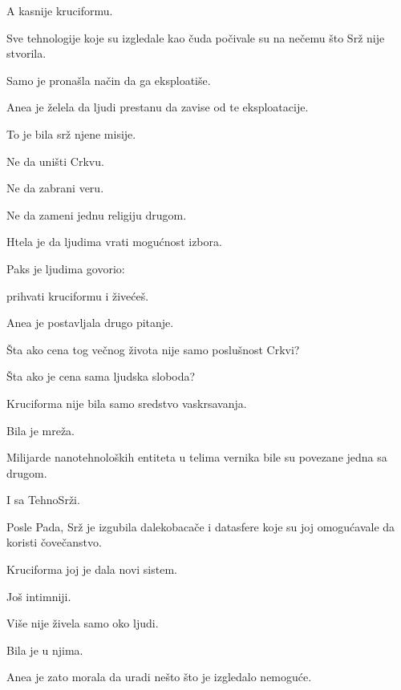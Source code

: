 A kasnije kruciformu.

\bigskip

Sve tehnologije koje su izgledale kao čuda počivale su na nečemu što Srž nije stvorila.

Samo je pronašla način da ga eksploatiše.

\bigskip

Anea je želela da ljudi prestanu da zavise od te eksploatacije.

\bigskip

To je bila srž njene misije.

Ne da uništi Crkvu.

Ne da zabrani veru.

Ne da zameni jednu religiju drugom.

\bigskip

Htela je da ljudima vrati mogućnost izbora.

\bigskip

Paks je ljudima govorio:

prihvati kruciformu i živećeš.

\bigskip

Anea je postavljala drugo pitanje.

\bigskip

Šta ako cena tog večnog života nije samo poslušnost Crkvi?

\bigskip

Šta ako je cena sama ljudska sloboda?

\bigskip

Kruciforma nije bila samo sredstvo vaskrsavanja.

Bila je mreža.

\bigskip

Milijarde nanotehnoloških entiteta u telima vernika bile su povezane jedna sa drugom.

I sa TehnoSrži.

\bigskip

Posle Pada, Srž je izgubila dalekobacače i datasfere koje su joj omogućavale da koristi čovečanstvo.

Kruciforma joj je dala novi sistem.

Još intimniji.

\bigskip

Više nije živela samo oko ljudi.

Bila je u njima.

\bigskip

Anea je zato morala da uradi nešto što je izgledalo nemoguće.


